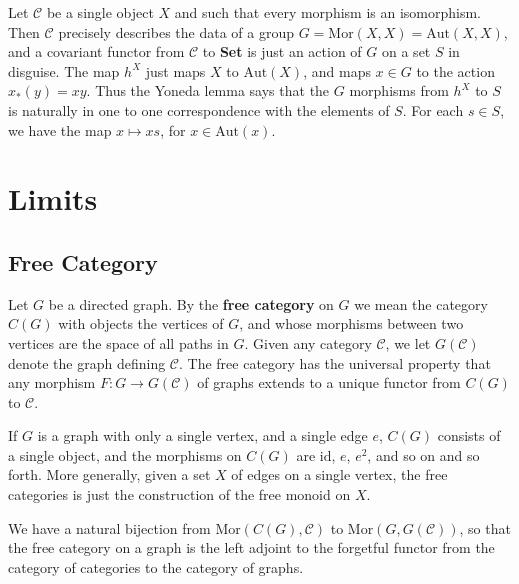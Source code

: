 \begin{example}
    Let $\mathcal{C}$ be a single object $X$ and such that every morphism is an isomorphism. Then $\mathcal{C}$ precisely describes the data of a group $G = \text{Mor}(X,X) = \text{Aut}(X,X)$, and a covariant functor from $\mathcal{C}$ to {\bf Set} is just an action of $G$ on a set $S$ in disguise. The map $h^X$ just maps $X$ to $\text{Aut}(X)$, and maps $x \in G$ to the action $x_*(y) = xy$. Thus the Yoneda lemma says that the $G$ morphisms from $h^X$ to $S$ is naturally in one to one correspondence with the elements of $S$. For each $s \in S$, we have the map $x \mapsto xs$, for $x \in \text{Aut}(x)$.
\end{example}





\chapter{Limits}

\section{Free Category}

Let $G$ be a directed graph. By the {\bf free category} on $G$ we mean the category $C(G)$ with objects the vertices of $G$, and whose morphisms between two vertices are the space of all paths in $G$. Given any category $\mathcal{C}$, we let $G(\mathcal{C})$ denote the graph defining $\mathcal{C}$. The free category has the universal property that any morphism $F: G \to G(\mathcal{C})$ of graphs extends to a unique functor from $C(G)$ to $\mathcal{C}$.

\begin{example}
    If $G$ is a graph with only a single vertex, and a single edge $e$, $C(G)$ consists of a single object, and the morphisms on $C(G)$ are $\text{id}$, $e$, $e^2$, and so on and so forth. More generally, given a set $X$ of edges on a single vertex, the free categories is just the construction of the free monoid on $X$.
\end{example}

We have a natural bijection from $\text{Mor}(C(G), \mathcal{C})$ to $\text{Mor}(G, G(\mathcal{C}))$, so that the free category on a graph is the left adjoint to the forgetful functor from the category of categories to the category of graphs.






